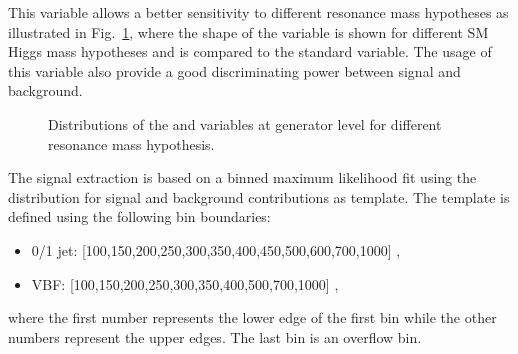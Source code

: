 This variable allows a better sensitivity to different resonance mass hypotheses as illustrated in Fig.~\ref{fig:mti}, where the shape of the \mti variable is shown for different SM Higgs mass hypotheses and is compared to the standard \mt variable. The usage of this variable also provide a good discriminating power between signal and background.

\begin{figure}[htb]
\centering
{}
\caption{
    Distributions of the \mt and \mti variables at generator level for different resonance mass hypothesis.}
    \label{fig:mti}
\end{figure}

The signal extraction is based on a binned maximum likelihood fit using the \mti distribution for signal and background contributions as template. The \mti template is defined using the following bin boundaries:
\begin{itemize}
\item {0/1 jet: } [100,150,200,250,300,350,400,450,500,600,700,1000] ,
\item {VBF: } [100,150,200,250,300,350,400,500,700,1000] ,
\end{itemize}
where the first number represents the lower edge of the first bin while the other numbers represent the upper edges. The last bin is an overflow bin.

